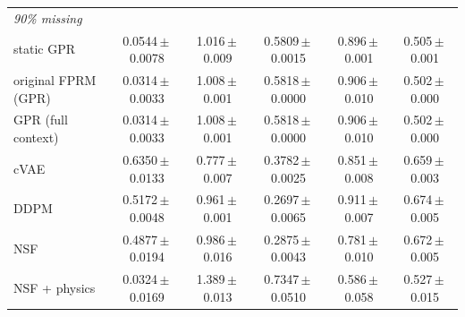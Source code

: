 \begin{tabular}{lccccc}
\midrule
\multicolumn{6}{l}{\textit{90\% missing}}\\
static GPR & 0.0544\,$\pm$\,0.0078 & 1.016\,$\pm$\,0.009 & 0.5809\,$\pm$\,0.0015 & 0.896\,$\pm$\,0.001 & 0.505\,$\pm$\,0.001\\
original FPRM (GPR) & 0.0314\,$\pm$\,0.0033 & 1.008\,$\pm$\,0.001 & 0.5818\,$\pm$\,0.0000 & 0.906\,$\pm$\,0.010 & 0.502\,$\pm$\,0.000\\
GPR (full context) & 0.0314\,$\pm$\,0.0033 & 1.008\,$\pm$\,0.001 & 0.5818\,$\pm$\,0.0000 & 0.906\,$\pm$\,0.010 & 0.502\,$\pm$\,0.000\\
cVAE & 0.6350\,$\pm$\,0.0133 & 0.777\,$\pm$\,0.007 & 0.3782\,$\pm$\,0.0025 & 0.851\,$\pm$\,0.008 & 0.659\,$\pm$\,0.003\\
DDPM & 0.5172\,$\pm$\,0.0048 & 0.961\,$\pm$\,0.001 & 0.2697\,$\pm$\,0.0065 & 0.911\,$\pm$\,0.007 & 0.674\,$\pm$\,0.005\\
NSF & 0.4877\,$\pm$\,0.0194 & 0.986\,$\pm$\,0.016 & 0.2875\,$\pm$\,0.0043 & 0.781\,$\pm$\,0.010 & 0.672\,$\pm$\,0.005\\
NSF + physics & 0.0324\,$\pm$\,0.0169 & 1.389\,$\pm$\,0.013 & 0.7347\,$\pm$\,0.0510 & 0.586\,$\pm$\,0.058 & 0.527\,$\pm$\,0.015\\
\bottomrule
\end{tabular}
